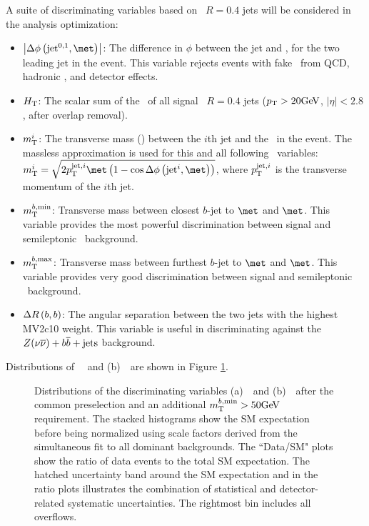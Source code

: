 A suite of discriminating variables based on \antikt\ $R=0.4$ jets will be considered in the analysis optimization: 
\begin{itemize}
	\item $\dphijettwomet$: The difference in $\phi$ between the jet and \met, for the two leading jet in the event. This variable rejects events with fake \met\ from QCD, hadronic \ttbar, and detector effects.
	\item $H_{\mathrm{T}}$: The scalar sum of the \pt\ of all signal \antikt\ $R=0.4$ jets ($\pt>20\gev$, $|\eta|<2.8$, after overlap removal).
	\item $m_{\mathrm{T}}^{i}$: The transverse mass (\mt) between the $i$th jet and the \met\ in the event. The massless approximation is used for this and all following \mt\ variables:\newline $\mtjetimet = \sqrt{2\ptjeti\met\left(1-\cos{\Delta\phi\left(\mathrm{jet}^i,\met\right)}\right)}$, where $p_{\mathrm{T}}^{\mathrm{jet},i}$ is the transverse momentum of the $i$th jet.
	\item $m_{\mathrm{T}}^{b,\mathrm{min}}$: Transverse mass between closest $b$-jet to $\met$ and $\met$. This variable provides the most powerful discrimination between signal and semileptonic \ttbar\ background.
	\item $m_{\mathrm{T}}^{b,\mathrm{max}}$: Transverse mass between furthest $b$-jet to $\met$ and $\met$. This variable provides very good discrimination between signal and semileptonic \ttbar\ background.
	\item $\Delta R\left(b,b\right)$: The angular separation between the two jets with the highest MV2c10 weight. This variable is useful in discriminating against the $Z(\nu\overline\nu)+b\overline{b}+\rm{jets}$ background.
\end{itemize}

Distributions of ~\mantikttwelvezero\ and (b)~\mtbmin\ are shown in Figure \ref{fig:preselection}.  

\begin{figure}[t]
  \begin{center}
    \caption{Distributions of the discriminating variables (a)~\mantikttwelvezero\ and (b)~\mtbmin\ after the common preselection and an additional $\mtbmin>50\gev$ requirement. The stacked histograms show the SM expectation before being normalized using scale factors derived from the simultaneous fit to all dominant backgrounds. The ``Data/SM" plots show the ratio of data events to the total SM expectation. The hatched uncertainty band around the SM expectation and in the ratio plots illustrates the combination of statistical and detector-related systematic uncertainties. The rightmost bin includes all overflows.}
    \label{fig:preselection}
  \end{center}
\end{figure}

